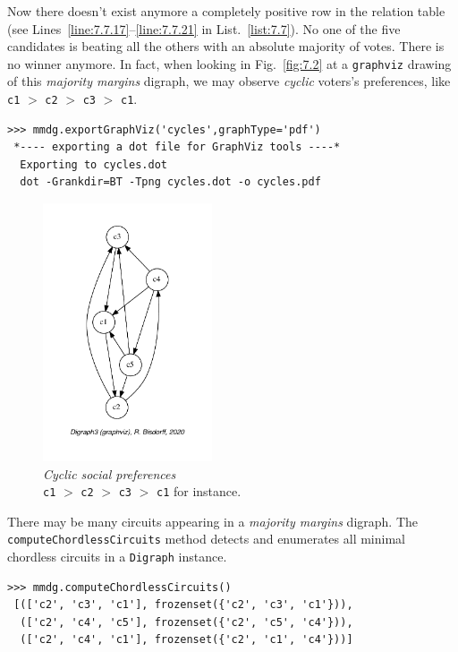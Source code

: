 Now there doesn't exist anymore a completely positive row in the relation table (see Lines~\ref{line:7.7.17}--\ref{line:7.7.21} in List.~\ref{list:7.7}). No one of the five candidates is beating all the others with an absolute majority of votes. There is no \Condorcet winner anymore. In fact, when looking in Fig.~\vref{fig:7.2} at a \texttt{graphviz} drawing of this \emph{majority margins} digraph, we may observe \emph{cyclic} voters's preferences, like \texttt{c1} $>$ \texttt{c2} $>$ \texttt{c3} $>$ \texttt{c1}.
\begin{lstlisting}
>>> mmdg.exportGraphViz('cycles',graphType='pdf')
 *---- exporting a dot file for GraphViz tools ----*
  Exporting to cycles.dot
  dot -Grankdir=BT -Tpng cycles.dot -o cycles.pdf
\end{lstlisting}
\begin{figure}[ht]
\sidecaption[t]
\includegraphics[width=5cm]{Figures/7-2-cycles.pdf}
\caption[Cyclic social preferences]{\emph{Cyclic social preferences}\\ \texttt{c1} $>$ \texttt{c2} $>$ \texttt{c3} $>$ \texttt{c1} for instance.}
\label{fig:7.2}       %
\end{figure}
	   
There may be many circuits appearing in a \emph{majority margins} digraph. The \texttt{computeChordlessCircuits} method detects and enumerates all minimal chordless circuits in a \texttt{Digraph} instance. 
\begin{lstlisting}
>>> mmdg.computeChordlessCircuits()
 [(['c2', 'c3', 'c1'], frozenset({'c2', 'c3', 'c1'})), 
  (['c2', 'c4', 'c5'], frozenset({'c2', 'c5', 'c4'})), 
  (['c2', 'c4', 'c1'], frozenset({'c2', 'c1', 'c4'}))]
\end{lstlisting}

